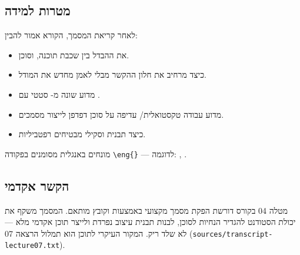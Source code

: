\subsection{מטרות למידה}

לאחר קריאת המסמך, הקורא אמור להבין:
\begin{itemize}[rightmargin=2em]
  \item את ההבדל בין שכבת תוכנה,  וסוכן.
  \item כיצד  מרחיב את חלון ההקשר מבלי לאמן מחדש את המודל.
  \item מדוע  שונה מ- סטטי עם .
  \item מדוע עבודה טקסטואלית/ עדיפה על סוכן דפדפן לייצור מסמכים.
  \item כיצד תבנית  וסקילי  מבטיחים רפטביליות.
\end{itemize}

\begin{notebox}
מונחים באנגלית מסומנים בפקודה \texttt{\textbackslash eng\{\}} --- לדוגמה:
, .
\end{notebox}

\subsection{הקשר אקדמי}

מטלה 04 בקורס  דורשת הפקת מסמך  מקצועי באמצעות
 וקובץ  מותאם. המסמך משקף את יכולת הסטודנט להגדיר
הנחיות לסוכן, לבנות תבנית עיצוב נפרדת ולייצר תוכן אקדמי מלא --- לא שלד ריק.
המקור העיקרי לתוכן הוא תמלול הרצאה 07 (\texttt{sources/transcript-lecture07.txt}).
